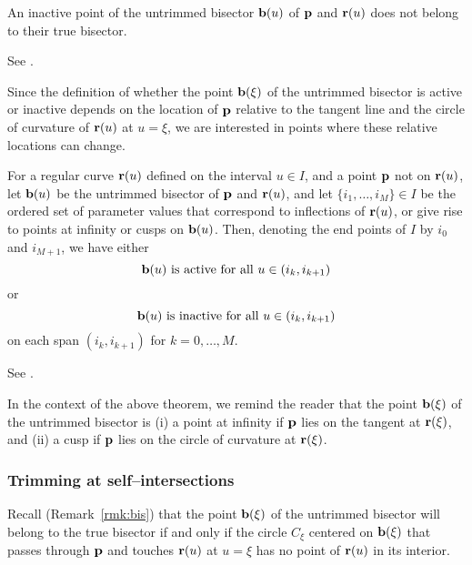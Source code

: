 \begin{rmk} {\rm
An inactive point of the untrimmed bisector ${\bf b}(u)$ of ${\bf p}$
and ${\bf r}(u)$ does not belong to their true bisector. }
\end{rmk}
\prf See \cite[Proposition~3.1]{farouki91b}. \QED

Since the definition of whether the point ${\bf b}(\xi)$ of the
untrimmed bisector is active or inactive depends on the location of
${\bf p}$ relative to the tangent line and the circle of curvature
of ${\bf r}(u)$ at $u=\xi$, we are interested in points where these
relative locations can change.

\begin{thm}
\label{thm:active}
For a regular curve ${\bf r}(u)$ defined on the interval $u \in I$,
and a point ${\bf p}$ not on ${\bf r}(u)$, let ${\bf b}(u)$ be the
untrimmed bisector of ${\bf p}$ and ${\bf r}(u)$, and let $\{i_1,\ldots,
i_M\} \in I$ be the ordered set of parameter values that correspond to
inflections of ${\bf r}(u)$, or give rise to points at infinity or
cusps on ${\bf b}(u)$. Then, denoting the end points of $I$ by $i_0$
and $i_{M+1}$, we have either
\begin{equation}
{\bf b}(u) {\rm \ is\ active\ for\ all\ } u \in (i_k,i_{k+1})
\end{equation}
or
\begin{equation}
{\bf b}(u) {\rm \ is\ inactive\ for\ all\ } u \in (i_k,i_{k+1})
\end{equation}
on each span $(i_k,i_{k+1})$ for $k=0,\ldots,M$.
\end{thm}
\prf  See \cite{farouki91b}. \QED

In the context of the above theorem, we remind the reader that
the point ${\bf b}(\xi)$ of the untrimmed bisector is (i) a point
at infinity if ${\bf p}$ lies on the tangent at ${\bf r}(\xi)$,
and (ii) a cusp if ${\bf p}$ lies on the circle of curvature at
${\bf r}(\xi)$.

\subsubsection{Trimming at self--intersections}
\label{sec:critical}

Recall (Remark~\ref{rmk:bis}) that the point ${\bf b}(\xi)$ of
the untrimmed bisector will belong to the true bisector if and
only if the circle $C_\xi$ centered on ${\bf b}(\xi)$ that passes
through ${\bf p}$ and touches ${\bf r}(u)$ at $u=\xi$ has no point
of ${\bf r}(u)$ in its interior.

